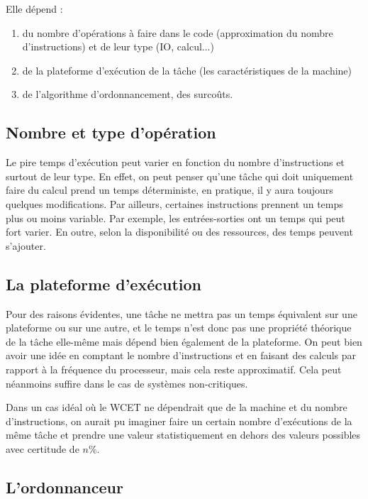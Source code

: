 	Elle dépend :
	\begin{enumerate}
		\item du nombre d'opérations à faire dans le code (approximation du nombre d'instructions) et de leur type (IO, calcul...)
		\item de la plateforme d'exécution de la tâche (les caractéristiques de la machine)
		\item de l'algorithme d'ordonnancement, des surcoûts.
	\end{enumerate}
	
	\subsection{Nombre et type d'opération}
	Le pire temps d'exécution peut varier en fonction du nombre d'instructions et surtout de leur type. En effet, 
	on peut penser qu'une tâche qui doit uniquement faire du calcul prend un temps déterministe, en pratique, 
	il y aura toujours quelques modifications. \newline
	Par ailleurs, certaines instructions prennent un temps plus ou moins variable. Par exemple, 
	les entrées-sorties ont un temps qui peut fort varier. En outre, selon la disponibilité ou 
	des ressources, des temps peuvent s'ajouter. 
	
	\subsection{La plateforme d'exécution}
	Pour des raisons évidentes, une tâche ne mettra pas un temps équivalent sur une plateforme ou sur une autre, 
	et le temps n'est donc pas une propriété théorique de la tâche elle-même mais dépend bien 
	également de la plateforme. On peut bien avoir une idée en comptant le nombre d'instructions et en faisant 
	des calculs par rapport à la fréquence du processeur, mais cela reste approximatif. 
	Cela peut néanmoins suffire dans le cas de systèmes non-critiques.\newline
	
	Dans un cas idéal où le WCET ne dépendrait que de la machine et du nombre d'instructions, 
	on aurait pu imaginer faire un certain nombre d'exécutions de la même tâche et prendre une valeur 
	statistiquement en dehors des valeurs possibles avec certitude de $n\%$. %

	\subsection{L'ordonnanceur}
	
